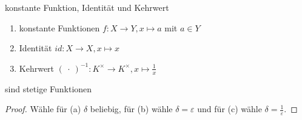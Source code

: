 \begin{lemma}{konstante Funktion, Identität und Kehrwert}{}
\begin{enumerate}[label=(\alph*)]
    \item konstante Funktionen $f: X \to Y, x \mapsto a$ mit $a \in Y$
    \item Identität $id: X \to X, x \mapsto x$
    \item Kehrwert $(\:\cdot\:)^{-1}: K^\times \to K^\times, x \mapsto \frac{1}{x}$
\end{enumerate}
sind stetige Funktionen
\end{lemma}
\begin{proof}
Wähle für (a) $\delta$ beliebig, für (b) wähle $\delta = \varepsilon$ und für (c) wähle $\delta = \frac{1}{\varepsilon}$.
\end{proof}

